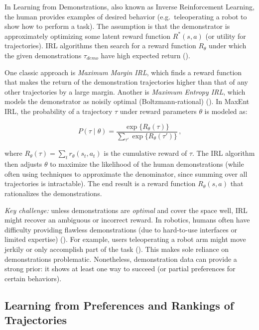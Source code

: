 \documentclass[
  letterpaper,
  numbers=noenddot,
  DIV=11]{scrreprt}
\theoremstyle{plain}
\theoremstyle{definition}
\theoremstyle{remark}
\begin{document}
In Learning from Demonstrations, also known as Inverse Reinforcement
Learning, the human provides examples of desired behavior
(e.g.~teleoperating a robot to show how to perform a task). The
assumption is that the demonstrator is approximately optimizing some
latent reward function \(R^*(s,a)\) (or utility for trajectories). IRL
algorithms then search for a reward function \(R_\theta\) under which
the given demonstrations \(\tau_{demo}\) have high expected return
().

One classic approach is \emph{Maximum Margin IRL}, which finds a reward
function that makes the return of the demonstration trajectories higher
than that of any other trajectories by a large margin. Another is
\emph{Maximum Entropy IRL}, which models the demonstrator as noisily
optimal (Boltzmann-rational)
(). In
MaxEnt IRL, the probability of a trajectory \(\tau\) under reward
parameters \(\theta\) is modeled as:

\[
P(\tau \mid \theta) = \frac{\exp\{R_\theta(\tau)\}}{\displaystyle \sum_{\tau'} \exp\{R_\theta(\tau')\}} \,,
\]

where \(R_\theta(\tau) = \sum_{t} r_\theta(s_t, a_t)\) is the cumulative
reward of \(\tau\). The IRL algorithm then adjusts \(\theta\) to
maximize the likelihood of the human demonstrations (while often using
techniques to approximate the denominator, since summing over all
trajectories is intractable). The end result is a reward function
\(R_\theta(s,a)\) that rationalizes the demonstrations.

\emph{Key challenge:} unless demonstrations are \emph{optimal} and cover
the space well, IRL might recover an ambiguous or incorrect reward. In
robotics, humans often have difficulty providing flawless demonstrations
(due to hard-to-use interfaces or limited expertise)
(). For
example, users teleoperating a robot arm might move jerkily or only
accomplish part of the task
(). This
makes sole reliance on demonstrations problematic. Nonetheless,
demonstration data can provide a strong prior: it shows at least one way
to succeed (or partial preferences for certain behaviors).

\subsection*{Learning from Preferences and Rankings of
Trajectories}\label{learning-from-preferences-and-rankings-of-trajectories}
\end{document}
